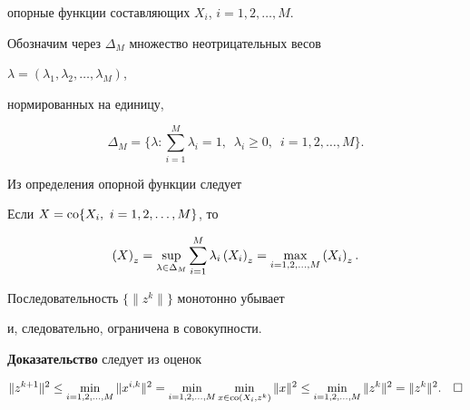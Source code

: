 опорные функции составляющих $X_i$, $i = 1,2, \dotsc, M $.


Обозначим через $\Delta_M$ множество неотрицательных весов


$\lambda = \left( \lambda_1, \lambda_2, \dotsc, \lambda_M \right )$,


нормированных на единицу,


$$


\Delta_M = \bigg\{ \lambda : \sum_{i=1}^M \lambda_i = 1,


\ \; \lambda_i \geq 0,\ \; i=1,2, \dotsc, M \bigg\}. 


$$





Из определения опорной функции следует





\begin{lem}\label{conv}


Если $X = \operatorname{co} \lbrace X_i,\ i = 1, 2, \dotsc, M \rbrace$, то


$$


\sP{X}{z} = \sup_{\lambda\in\Delta_M} \sum_{i=1}^M \lambda_i \sP{X_i}{z}


= \max_{i=1,2,\dotsc, M} \sP{X_i}{z}.


$$


\end{lem}





\begin{lem}\label{mono}


Последовательность $\lbrace\|z^k\|\rbrace$ монотонно убывает 


и, следовательно, ограничена в совокупности.


\end{lem}





{\bf Доказательство} следует из оценок


$$


\|z^{k+1}\|^2 \leq \min_{i=1,2,\dotsc, M} \| x^{i,k}\|^2 =


\min_{i=1,2,\dotsc, M} \min_{x \in \co \left( X_i, z^k \right) }


\|x\|^2 \leq


\min_{i=1,2,\dotsc, M} \|z^k\|^2 = \|z^k\|^2.\quad\square


$$


\medskip





